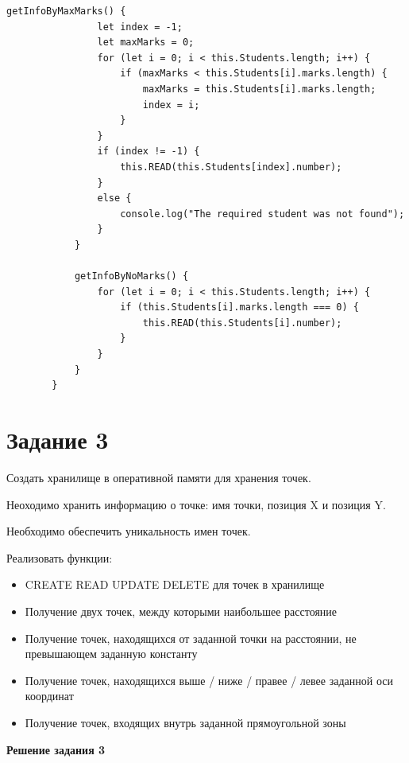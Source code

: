 \documentclass[12pt]{report}
\begin{document}
\begin{lstlisting}[label=Task1.2,caption=Файл StudentsHolder.js]
			getInfoByMaxMarks() {
				let index = -1;
				let maxMarks = 0;
				for (let i = 0; i < this.Students.length; i++) {
					if (maxMarks < this.Students[i].marks.length) {
						maxMarks = this.Students[i].marks.length;
						index = i;
					} 
				}
				if (index != -1) {
					this.READ(this.Students[index].number);
				}
				else {
					console.log("The required student was not found");
				}
			}
			
			getInfoByNoMarks() {
				for (let i = 0; i < this.Students.length; i++) {
					if (this.Students[i].marks.length === 0) {
						this.READ(this.Students[i].number);
					}
				}
			}
		} 
	\end{lstlisting}
	
	\newpage
	\section{Задание 3}
	\noindent Создать хранилище в оперативной памяти для хранения точек.\par
	\noindent Неоходимо хранить информацию о точке: имя точки, позиция X и позиция Y.\par
	\noindent Необходимо обеспечить уникальность имен точек.\par
	\noindent Реализовать функции:\par
	\begin{itemize}
		\item CREATE READ UPDATE DELETE для точек в хранилище
		\item Получение двух точек, между которыми наибольшее расстояние
		\item Получение точек, находящихся от заданной точки на расстоянии, не превышающем заданную константу
		\item Получение точек, находящихся выше / ниже / правее / левее заданной оси координат
		\item Получение точек, входящих внутрь заданной прямоугольной зоны
	\end{itemize}
	\textbf{Решение задания 3}
\end{document}
